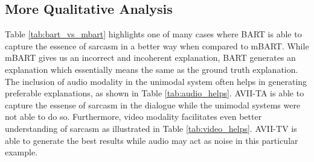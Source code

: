 \documentclass[11pt]{article}
\begin{document}
\subsection{More Qualitative Analysis}
\label{sec:app_qual_analysis}
Table \ref{tab:bart_vs_mbart} highlights one of many cases where BART is able to capture the essence of sarcasm in a better way when compared to mBART. While mBART gives us an incorrect and incoherent explanation, BART generates an explanation which essentially means the same as the ground truth explanation. The inclusion of audio modality in the unimodal system often helps in generating preferable explanations, as shown in Table \ref{tab:audio_helps}. AVII-TA is able to capture the essense of sarcasm in the dialogue while the unimodal systems were not able to do so. Furthermore, video modality facilitates even better understanding of sarcasm as illustrated in Table \ref{tab:video_helps}. AVII-TV is able to generate the best results while audio may act as noise in this particular example.
\end{document}
